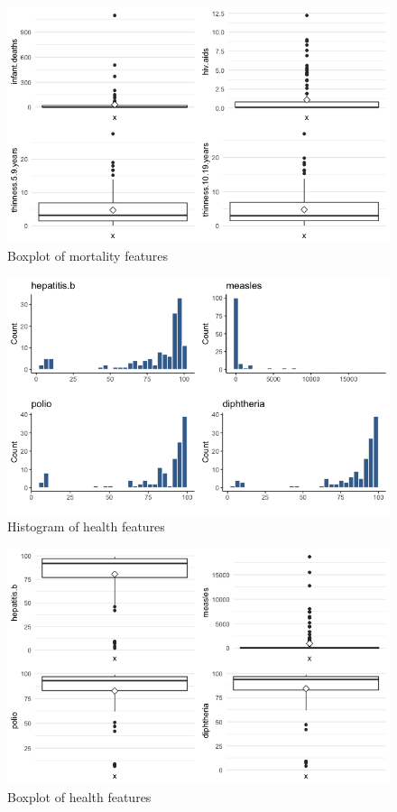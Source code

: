\begin{figure}[H]
	\centering
	\includegraphics{figures/eda/boxplot_mortality_features.png}
	\caption{Boxplot of mortality features}
	\label{fig:boxplot_mortality_features}
\end{figure}


\begin{figure}[H]
	\centering
	\includegraphics{figures/eda/histogram_health_features.png}
	\caption{Histogram of health features}
	\label{fig:histogram_health_features}
\end{figure}

\begin{figure}[H]
	\centering
	\includegraphics{figures/eda/boxplot_health_features.png}
	\caption{Boxplot of health features}
	\label{fig:boxplot_health_features}
\end{figure}

